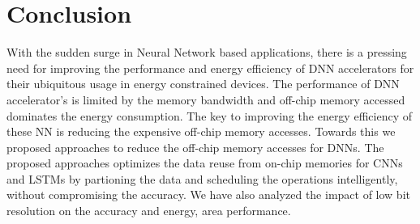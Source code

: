 \documentclass[a4paper,10pt]{article}
\begin{document}
\section{Conclusion}
With the sudden surge in Neural Network based applications, there is a pressing need for improving the performance and energy efficiency of DNN accelerators for their ubiquitous usage in energy constrained devices. The performance of DNN accelerator's is limited by the memory bandwidth and off-chip memory accessed dominates the energy consumption. The key to improving the energy efficiency of these NN is reducing the expensive off-chip memory accesses. Towards this we proposed approaches to reduce the off-chip memory accesses for DNNs. The proposed approaches optimizes the data reuse from on-chip memories for CNNs and LSTMs by partioning the data and scheduling the operations intelligently, without compromising the accuracy. We have also analyzed the impact of low bit resolution on the accuracy and energy, area performance. 

\end{document}
